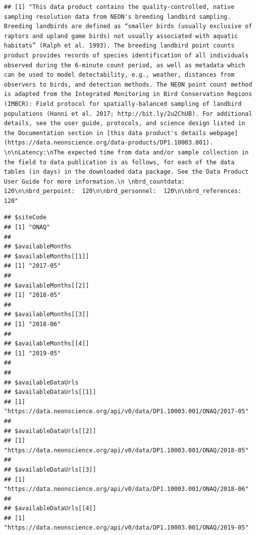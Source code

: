 \documentclass[]{book}
\newenvironment{Shaded}{\begin{snugshade}}{\end{snugshade}}
\newcommand{\CommentTok}[1]{\textcolor[rgb]{0.56,0.35,0.01}{\textit{#1}}}
\newcommand{\DecValTok}[1]{\textcolor[rgb]{0.00,0.00,0.81}{#1}}
\newcommand{\NormalTok}[1]{#1}
\newcommand{\OperatorTok}[1]{\textcolor[rgb]{0.81,0.36,0.00}{\textbf{#1}}}
\begin{document}
\begin{verbatim}
## [1] "This data product contains the quality-controlled, native sampling resolution data from NEON's breeding landbird sampling. Breeding landbirds are defined as “smaller birds (usually exclusive of raptors and upland game birds) not usually associated with aquatic habitats” (Ralph et al. 1993). The breeding landbird point counts product provides records of species identification of all individuals observed during the 6-minute count period, as well as metadata which can be used to model detectability, e.g., weather, distances from observers to birds, and detection methods. The NEON point count method is adapted from the Integrated Monitoring in Bird Conservation Regions (IMBCR): Field protocol for spatially-balanced sampling of landbird populations (Hanni et al. 2017; http://bit.ly/2u2ChUB). For additional details, see the user guide, protocols, and science design listed in the Documentation section in [this data product's details webpage](https://data.neonscience.org/data-products/DP1.10003.001). \n\nLatency:\nThe expected time from data and/or sample collection in the field to data publication is as follows, for each of the data tables (in days) in the downloaded data package. See the Data Product User Guide for more information.\n \nbrd_countdata:  120\n\nbrd_perpoint:  120\n\nbrd_personnel:  120\n\nbrd_references:  120"
\end{verbatim}

\begin{Shaded}
\end{Shaded}

\begin{verbatim}
## $siteCode
## [1] "ONAQ"
## 
## $availableMonths
## $availableMonths[[1]]
## [1] "2017-05"
## 
## $availableMonths[[2]]
## [1] "2018-05"
## 
## $availableMonths[[3]]
## [1] "2018-06"
## 
## $availableMonths[[4]]
## [1] "2019-05"
## 
## 
## $availableDataUrls
## $availableDataUrls[[1]]
## [1] "https://data.neonscience.org/api/v0/data/DP1.10003.001/ONAQ/2017-05"
## 
## $availableDataUrls[[2]]
## [1] "https://data.neonscience.org/api/v0/data/DP1.10003.001/ONAQ/2018-05"
## 
## $availableDataUrls[[3]]
## [1] "https://data.neonscience.org/api/v0/data/DP1.10003.001/ONAQ/2018-06"
## 
## $availableDataUrls[[4]]
## [1] "https://data.neonscience.org/api/v0/data/DP1.10003.001/ONAQ/2019-05"
\end{verbatim}
\end{document}
